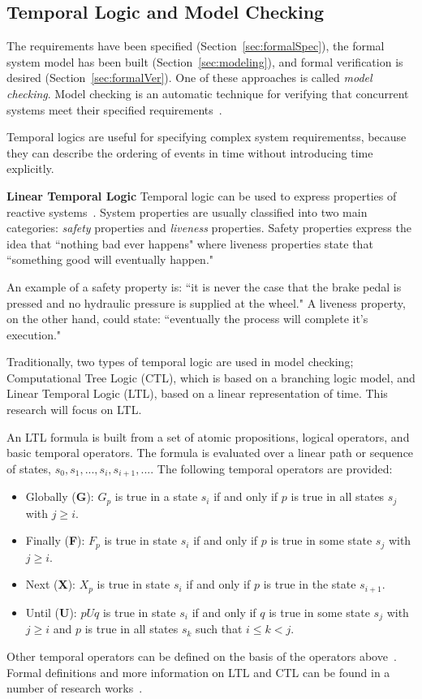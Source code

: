 \subsection{Temporal Logic and Model Checking}
\label{sec:modelchecking}
The requirements have been specified (Section~\ref{sec:formalSpec}), the formal system model has been built (Section~\ref{sec:modeling}), and formal verification is desired (Section~\ref{sec:formalVer}). One of these approaches is called \emph{model checking}. Model checking is an automatic technique for verifying that concurrent systems meet their specified requirements~\cite{clarke2018model}.  

Temporal logics are useful for specifying complex system requirementss, because they can describe the ordering of events in time without introducing time explicitly. 


\textbf{Linear Temporal Logic}
Temporal logic can be used to express properties of reactive systems~\cite{Bozzano:2010:DSA:1951720}. System properties are usually classified into two main categories: {\em safety} properties and {\em liveness} properties. Safety properties express the idea that ``nothing bad ever happens" where liveness properties state that ``something good will eventually happen." 

An example of a safety property is: ``it is never the case that the brake pedal is pressed and no hydraulic pressure is supplied at the wheel." A liveness property, on the other hand, could state: ``eventually the process will complete it's execution." 

Traditionally, two types of temporal logic are used in model checking; Computational Tree Logic (CTL), which is based on a branching logic model, and Linear Temporal Logic (LTL), based on a linear representation of time. This research will focus on LTL. 

An LTL formula is built from a set of atomic propositions, logical operators, and basic temporal operators. The formula is evaluated over a linear path or sequence of states, $s_0, s_1, ..., s_i ,s_{i+1},...$. The following temporal operators are provided:
\begin{itemize}
    \item Globally (\textbf{G}): $G_p$ is true in a state $s_i$ if and only if $p$ is true in all states $s_j$ with $j \geq i$.
    
    \item Finally (\textbf{F}): $F_p$ is true in state $s_i$ if and only if $p$ is true in some state $s_j$ with $j \geq i$.
    
    \item Next (\textbf{X}): $X_p$ is true in state $s_i$ if and only if $p$ is true in the state $s_{i+1}$. 
    
    \item Until (\textbf{U}): $pUq$ is true in state $s_i$ if and only if $q$ is true in some state $s_j$ with $j \geq i$ and $p$ is true in all states $s_k$ such that $i \leq k < j$.
\end{itemize}

Other temporal operators can be defined on the basis of the operators above~\cite{sistla1985complexity}. Formal definitions and more information on LTL and CTL can be found in a number of research works~\cite{Bozzano:2010:DSA:1951720, clarke2018model}.